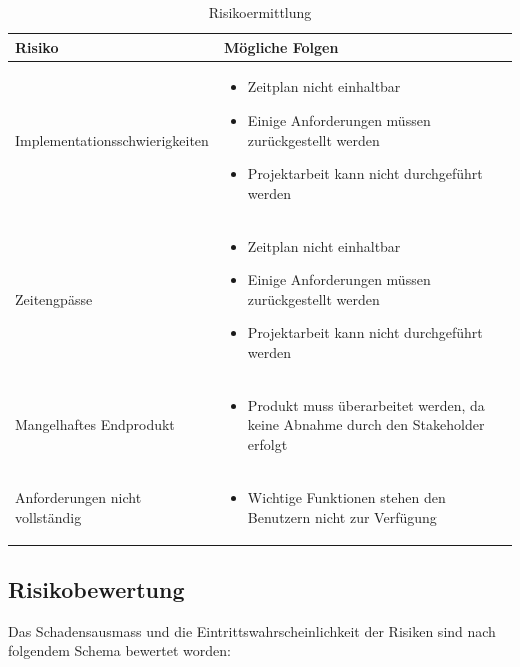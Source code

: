 \begin{table}[ht]
\centering
  \begin{tabular}{  p{5cm} | p{9cm} }
	\hline
	\rowcolor{gray}
	\textbf{Risiko}					&	\textbf{Mögliche Folgen}	\\ \hline
	Implementationsschwierigkeiten			&	\begin{itemize}
										\item Zeitplan nicht einhaltbar
										\item Einige Anforderungen müssen zurückgestellt werden
										\item Projektarbeit kann nicht durchgeführt werden
									\end{itemize}	\\ \hline
	Zeitengpässe
								&	\begin{itemize}
										\item Zeitplan nicht einhaltbar
										\item Einige Anforderungen müssen zurückgestellt werden
										\item Projektarbeit kann nicht durchgeführt werden
									\end{itemize}	\\ \hline
	Mangelhaftes Endprodukt		
								&	\begin{itemize}
										\item Produkt muss überarbeitet werden, da keine Abnahme durch den Stakeholder erfolgt
									\end{itemize}	\\ \hline	
	Anforderungen nicht vollständig	
								&	\begin{itemize}
										\item Wichtige Funktionen stehen den Benutzern nicht zur Verfügung
									\end{itemize}	\\ \hline			
  \end{tabular}
   \caption{Risikoermittlung}
\end{table}

\subsection{Risikobewertung}
Das Schadensausmass und die Eintrittswahrscheinlichkeit der Risiken sind nach folgendem Schema bewertet worden:

